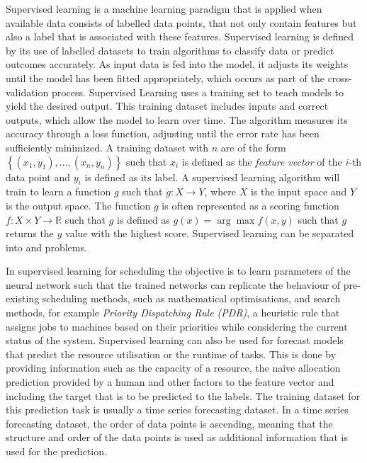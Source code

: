         Supervised learning is a machine learning paradigm that is applied when available data consists of labelled data points, that not only contain features but also a label that is associated with these features.
        Supervised learning is defined by its use of labelled datasets to train algorithms to classify data or predict outcomes accurately.
        As input data is fed into the model, it adjusts its weights until the model has been fitted appropriately, which occurs as part of the cross-validation process.
        Supervised Learning uses a training set to teach models to yield the desired output.  
        This training dataset includes inputs and correct outputs, which allow the model to learn over time. The algorithm measures its accuracy through a loss function, adjusting until the error rate has been sufficiently minimized.
        A training dataset with $n$ are of the form $\left\{(x_1, y_1), \dots , (x_n, y_n)\right\}$ such that $x_i$ is defined as the \emph{feature vector} of the $i$-th data point and $y_i$ is defined as its label.
        A supervised learning algorithm will train to learn a function $g$ such that $g: X \rightarrow Y$, where $X$ is the input space and $Y$ is the output space.
        The function $g$ is often represented as a scoring function $f: X \times Y \rightarrow \mathbb{R}$ such that $g$ is defined as $g(x) = \arg \max f(x, y)$ such that $g$ returns the $y$ value with the highest score.
        Supervised learning can be separated into  and  problems.

        In supervised learning for scheduling the objective is to learn parameters of the neural network such that the trained networks can replicate the behaviour of pre-existing scheduling methods, such as mathematical optimisations, and search methods, for example \emph{Priority Dispatching Rule (PDR)}, a heuristic rule that assigns jobs to machines based on their priorities while considering the current status of the system.
        Supervised learning can also be used for forecast models that predict the resource utilisation or the runtime of tasks.
        This is done by providing information such as the capacity of a resource, the naive allocation prediction provided by a human and other factors to the feature vector and including the target that is to be predicted to the labels. 
        The training dataset for this prediction task is usually a time series forecasting dataset.
        In a time series forecasting dataset, the order of data points is ascending, meaning that the structure and order of the data points is used as additional information that is used for the prediction.


